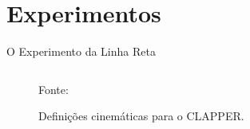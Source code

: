 \documentclass[xcolor=dvipsnames, aspectratio=169]{beamer}
\begin{document}
\section{Experimentos}
\begin{frame}{O Experimento da Linha Reta}
  \begin{columns}
    \begin{column}{0.5\textwidth}
      \begin{figure}
        \centering
        {Fonte: \cite{borenstein1995intemal}}
        \caption{Definições cinemáticas para o CLAPPER.}
        \label{fig:3_Return_position_errors_after_completing_the_Straight_Path_Experiment}
      \end{figure}  
    \end{column}


\end{columns}
\end{frame}
\end{document}

